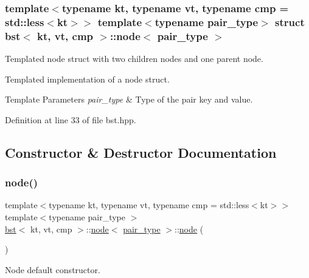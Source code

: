 \subsubsection*{template$<$typename kt, typename vt, typename cmp = std\+::less$<$kt$>$$>$\newline
template$<$typename pair\+\_\+type$>$\newline
struct bst$<$ kt, vt, cmp $>$\+::node$<$ pair\+\_\+type $>$}

Templated node struct with two children nodes and one parent node. 

Templated implementation of a node struct.


\begin{DoxyTemplParams}{Template Parameters}
{\em pair\+\_\+type} & Type of the pair key and value. \\
\hline
\end{DoxyTemplParams}


Definition at line 33 of file bst.\+hpp.



\subsection{Constructor \& Destructor Documentation}
\mbox{\label{structbst_1_1node_a79aa79c3ff256126de5fdc848ec88b45}} 
\subsubsection{\texorpdfstring{node()}{node()}\hspace{0.1cm}{\footnotesize\ttfamily [1/5]}}
{\footnotesize\ttfamily template$<$typename kt, typename vt, typename cmp = std\+::less$<$kt$>$$>$ \\
template$<$typename pair\+\_\+type $>$ \\
\hyperlink{classbst}{bst}$<$ kt, vt, cmp $>$\+::\hyperlink{structbst_1_1node}{node}$<$ \hyperlink{classbst_a7b11cca2a3b4394915600194f741ab16}{pair\+\_\+type} $>$\+::\hyperlink{structbst_1_1node}{node} (\begin{DoxyParamCaption}{ }\end{DoxyParamCaption})\hspace{0.3cm}{\ttfamily [inline]}}



Node default constructor. 

